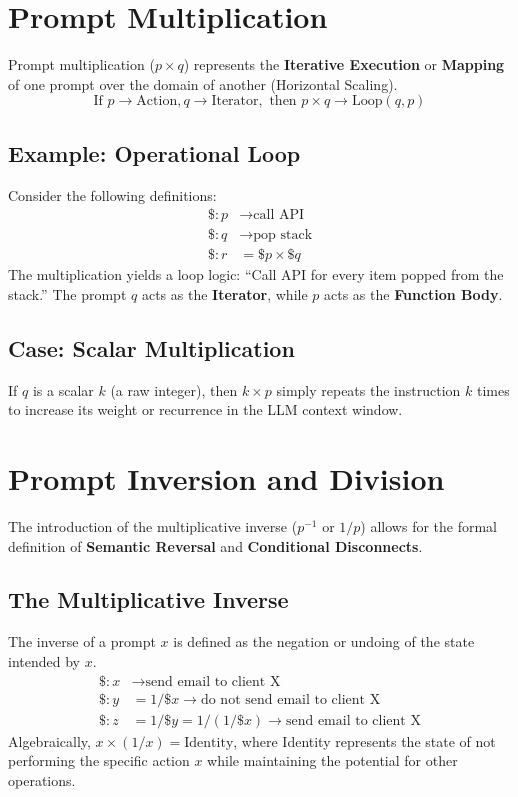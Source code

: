 \documentclass[11pt, a4paper]{article}
\begin{document}
\section{Prompt Multiplication}
Prompt multiplication ($p \times q$) represents the \textbf{Iterative Execution} or \textbf{Mapping} of one prompt over the domain of another (Horizontal Scaling).
$$ \text{If } p \rightarrow \text{Action}, q \rightarrow \text{Iterator}, \text{ then } p \times q \rightarrow \text{Loop}(q, p) $$

\subsection{Example: Operational Loop}
Consider the following definitions:
\begin{align*}
    \$: p &\rightarrow \text{call API} \\
    \$: q &\rightarrow \text{pop stack} \\
    \$: r &= \$p \times \$q
\end{align*}
The multiplication yields a loop logic: ``Call API for every item popped from the stack.'' The prompt $q$ acts as the \textbf{Iterator}, while $p$ acts as the \textbf{Function Body}.

\subsection{Case: Scalar Multiplication}
If $q$ is a scalar $k$ (a raw integer), then $k \times p$ simply repeats the instruction $k$ times to increase its weight or recurrence in the LLM context window.

\section{Prompt Inversion and Division}
The introduction of the multiplicative inverse ($p^{-1}$ or $1/p$) allows for the formal definition of \textbf{Semantic Reversal} and \textbf{Conditional Disconnects}.

\subsection{The Multiplicative Inverse}
The inverse of a prompt $x$ is defined as the negation or undoing of the state intended by $x$.
\begin{align*}
    \$: x &\rightarrow \text{send email to client X} \\
    \$: y &= 1/\$x \rightarrow \text{do not send email to client X} \\
    \$: z &= 1/\$y = 1/(1/\$x) \rightarrow \text{send email to client X}
\end{align*}
Algebraically, $x \times (1/x) = \text{Identity}$, where Identity represents the state of not performing the specific action $x$ while maintaining the potential for other operations.
\end{document}
